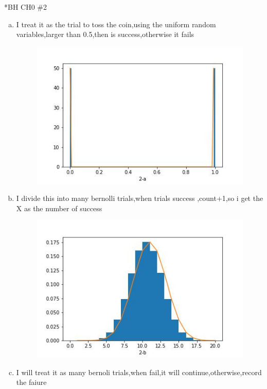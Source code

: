 \documentclass{article}
\begin{document}
\begin{homeworkProblem}*{BH CH0 \#2}
\begin{enumerate}[(a)]
	\item I treat it as the trial to toss the coin,using the uniform random variables,larger than 0.5,then is success,otherwise it fails
	\begin{figure}[htbp]
		\includegraphics[width=\linewidth]{2-a.jpg}
	\end{figure}
	\newpage
	\item I divide this into many bernolli trials,when trials success ,count+1,so i get the X as the number of success
	\begin{figure}[htbp]
		\includegraphics[width=\linewidth]{2-b.jpg}
	\end{figure}
	\newpage
	\item I will treat it as  many bernoli trials,when fail,it will continue,otherwise,record the faiure

\end{enumerate}
\end{homeworkProblem}
\end{document}
